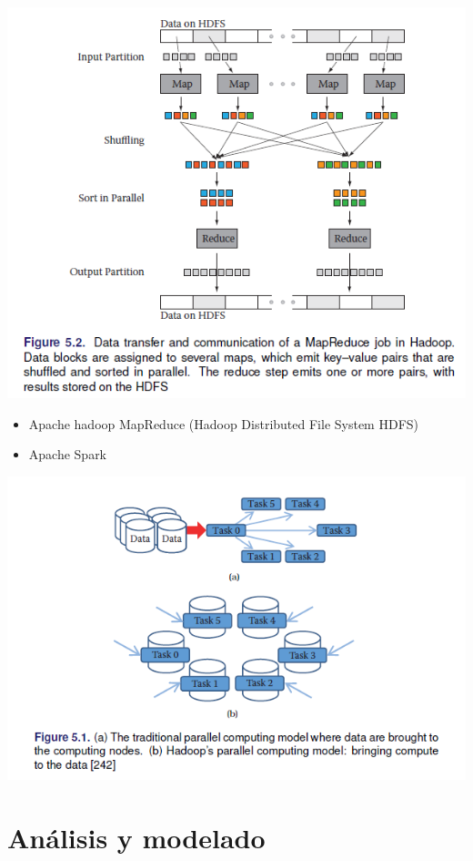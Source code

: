 \documentclass[
]{book}
\providecommand{\tightlist}{%
  \setlength{\itemsep}{0pt}\setlength{\parskip}{0pt}}
\begin{document}
\includegraphics{images/bd5.PNG}

\begin{itemize}
\tightlist
\item
  Apache hadoop MapReduce (Hadoop Distributed File System HDFS)
\item
  Apache Spark
\end{itemize}

\includegraphics{images/bd4.PNG}

\hypertarget{anuxe1lisis-y-modelado}{%
\section{Análisis y modelado}\label{anuxe1lisis-y-modelado}}
\end{document}
